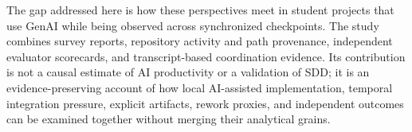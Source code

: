 The gap addressed here is how these perspectives meet in student projects that
use GenAI while being observed across synchronized checkpoints. The study
combines survey reports, repository activity and path provenance, independent
evaluator scorecards, and transcript-based coordination evidence. Its
contribution is not a causal estimate of AI productivity or a validation of
SDD; it is an evidence-preserving account of how local AI-assisted
implementation, temporal integration pressure, explicit artifacts, rework
proxies, and independent outcomes can be examined together without merging
their analytical grains.
